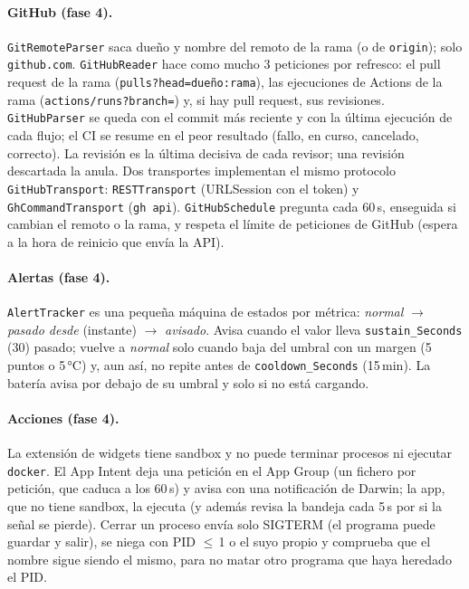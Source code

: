 \documentclass[11pt,a4paper]{article}
\begin{document}
\paragraph{GitHub (fase 4).} \texttt{GitRemoteParser} saca dueño y
nombre del remoto de la rama (o de \texttt{origin}); solo
\texttt{github.com}. \texttt{GitHubReader} hace como mucho 3
peticiones por refresco: el pull request de la rama
(\texttt{pulls?head=dueño:rama}), las ejecuciones de Actions de la
rama (\texttt{actions/runs?branch=}) y, si hay pull request, sus
revisiones. \texttt{GitHubParser} se queda con el commit más reciente
y con la última ejecución de cada flujo; el CI se resume en el peor
resultado (fallo, en curso, cancelado, correcto). La revisión es la
última decisiva de cada revisor; una revisión descartada la anula.
Dos transportes implementan el mismo protocolo
\texttt{GitHubTransport}: \texttt{RESTTransport} (URLSession con el
token) y \texttt{GhCommandTransport} (\texttt{gh api}).
\texttt{GitHubSchedule} pregunta cada 60\,s, enseguida si cambian el
remoto o la rama, y respeta el límite de peticiones de GitHub
(espera a la hora de reinicio que envía la API).

\paragraph{Alertas (fase 4).} \texttt{AlertTracker} es una pequeña
máquina de estados por métrica: \emph{normal} $\to$ \emph{pasado
desde} (instante) $\to$ \emph{avisado}. Avisa cuando el valor lleva
\texttt{sustain\_Seconds} (30) pasado; vuelve a \emph{normal} solo
cuando baja del umbral con un margen (5 puntos o 5\,°C) y, aun así,
no repite antes de \texttt{cooldown\_Seconds} (15\,min). La batería
avisa por debajo de su umbral y solo si no está cargando.

\paragraph{Acciones (fase 4).} La extensión de widgets tiene sandbox
y no puede terminar procesos ni ejecutar \texttt{docker}. El App
Intent deja una petición en el App Group (un fichero por petición,
que caduca a los 60\,s) y avisa con una notificación de Darwin; la
app, que no tiene sandbox, la ejecuta (y además revisa la bandeja
cada 5\,s por si la señal se pierde). Cerrar un proceso envía solo
SIGTERM (el programa puede guardar y salir), se niega con PID
$\le$\,1 o el suyo propio y comprueba que el nombre sigue siendo el
mismo, para no matar otro programa que haya heredado el PID.
\end{document}
